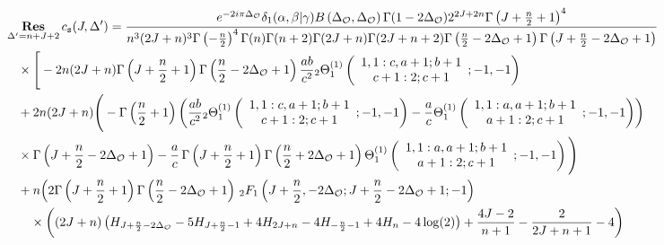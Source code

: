 \begin{align}
&\mathop{\mathbf{Res}}_{\Delta' = n+J+2}c_{\texttt{s}}(J,\Delta')
=\frac{e^{-2 i \pi  \Delta_{\mathcal{O}}}\delta_1(\alpha,\beta|\gamma) B\left(\Delta_{\mathcal{O}},\Delta_{\mathcal{O}}\right)\Gamma (1-2 \Delta_{\mathcal{O}}) 2^{2 J+2 n} \Gamma \left(J+\frac{n}{2}+1\right)^4}{ n^3 (2 J+n)^3 \Gamma \left(-\frac{n}{2}\right)^4 \Gamma (n) \Gamma (n+2) \Gamma (2 J+n) \Gamma (2 J+n+2) \Gamma \left(\frac{n}{2}-2 \Delta_{\mathcal{O}}+1\right) \Gamma \left(J+\frac{n}{2}-2 \Delta_{\mathcal{O}}+1\right)}\notag\\
&\quad
 \times\Bigg[-2 n (2 J+n) \Gamma \left(J+\frac{n}{2}+1\right) \Gamma \left(\frac{n}{2}-2 \Delta_{\mathcal{O}}+1\right) \frac{ab}{c^2}{_2}\Theta_1^{(1)} \left( 
\begin{array}{c} 
1, 1 : c, a + 1; b + 1 \\
c + 1 : 2; c + 1 
\end{array} 
; -1, -1 \right)\notag\\
&\quad +2 n (2 J+n) \Bigg(-\Gamma \left(\frac{n}{2}+1\right) \left(\frac{ab}{c^2}{_2}\Theta_1^{(1)} \left( 
\begin{array}{c} 
1, 1 : c, a + 1; b + 1 \\
c + 1 : 2; c + 1 
\end{array} 
; -1, -1 \right)-\frac{a}{c}\Theta_1^{(1)} \left( 
\begin{array}{c} 
1, 1 : a, a + 1; b + 1 \\
a + 1 : 2; c + 1 
\end{array} 
; -1, -1 \right)\right)\notag\\
&\quad \times\Gamma \left(J+\frac{n}{2}-2 \Delta_{\mathcal{O}}+1\right)-\frac{a}{c}\,\Gamma \left(J+\frac{n}{2}+1\right) \Gamma \left(\frac{n}{2}+2 \Delta_{\mathcal{O}}+1\right) \Theta_1^{(1)} \left( 
\begin{array}{c} 
1, 1 : a, a + 1; b + 1 \\
a + 1 : 2; c + 1 
\end{array} 
; -1, -1 \right)\Bigg)\notag\\
&\quad+n \Big(2 \Gamma \left(J+\frac{n}{2}+1\right) \Gamma \left(\frac{n}{2}-2 \Delta_{\mathcal{O}}+1\right) \, _2F_1\left(J+\frac{n}{2},-2 \Delta_{\mathcal{O}};J+\frac{n}{2}-2 \Delta_{\mathcal{O}}+1;-1\right)\notag\\
&\qquad \times\left((2 J+n) \left(H_{J+\frac{n}{2}-2 \Delta_{\mathcal{O}}}-5 H_{J+\frac{n}{2}-1}+4 H_{2 J+n}-4 H_{-\frac{n}{2}-1}+4 H_n-4 \log (2)\right)+\frac{4 J-2}{n+1}-\frac{2}{2 J+n+1}-4\right)\notag\\

\end{align}
